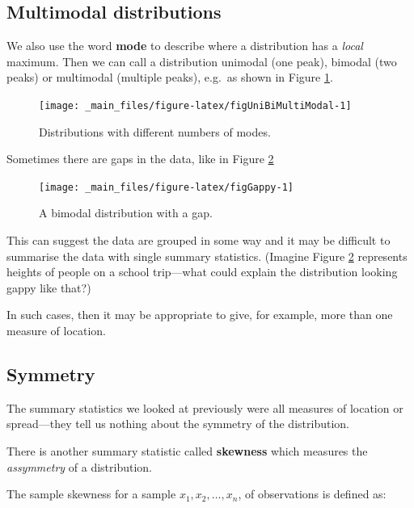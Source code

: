 \documentclass[
]{book}
\begin{document}
\hypertarget{visual_data-features_multi}{%
\subsection{\texorpdfstring{{\textbf{Multimodal distributions}}}{Multimodal distributions}}\label{visual_data-features_multi}}

We also use the word \textbf{mode} to describe where a distribution has a \emph{local} maximum. Then we can call a distribution unimodal (one peak),
bimodal (two peaks) or
multimodal (multiple peaks), e.g.~as shown in Figure \ref{fig:figUniBiMultiModal}.

\begin{figure}
\texttt{[image: \_main\_files/figure-latex/figUniBiMultiModal-1]} \caption{Distributions with different numbers of modes.}\label{fig:figUniBiMultiModal}
\end{figure}

Sometimes there are gaps in the data, like in Figure \ref{fig:figGappy}

\begin{figure}
\texttt{[image: \_main\_files/figure-latex/figGappy-1]} \caption{A bimodal distribution with a gap.}\label{fig:figGappy}
\end{figure}

This can suggest the data are grouped in some way and it may be difficult
to summarise the data with single summary statistics. (Imagine Figure \ref{fig:figGappy} represents heights of people on a school trip---what could explain the distribution looking gappy like that?)

In such cases, then it may be appropriate to give, for example, more than one measure of location.

\hypertarget{visual_data-features_symmetry}{%
\subsection{\texorpdfstring{{\textbf{Symmetry}}}{Symmetry}}\label{visual_data-features_symmetry}}

The summary statistics we looked at previously were all measures of location or
spread---they tell us nothing about the symmetry of the distribution.

There is another summary statistic called \textbf{skewness} which measures the
\emph{assymmetry} of a distribution.

The sample skewness for a sample
\(x_1 , x_2 , \ldots , x_n\), of observations is defined as:
\end{document}
